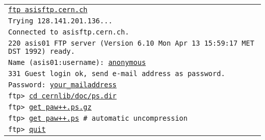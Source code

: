 \vspace*{3mm}
\begin{tabular}{@{\hspace{5mm}}>{\tt}l}
\underline{ftp asisftp.cern.ch}\\
Trying 128.141.201.136...\\
Connected to asisftp.cern.ch.\\
220 asis01 FTP server (Version 6.10 Mon Apr 13 15:59:17 MET DST 1992) ready.\\
Name (asis01:username): \underline{anonymous}\\
331 Guest login ok, send e-mail address as password.\\
Password: \underline{your\_{}mailaddress}\\
ftp> \underline{cd cernlib/doc/ps.dir}\\
ftp> \underline{get paw++.ps.gz}\\
ftp> \underline{get paw++.ps} \hspace{1.cm}  \# automatic uncompression\\
ftp> \underline{quit}\\
\end{tabular}
 
\newpage
\tableofcontents
